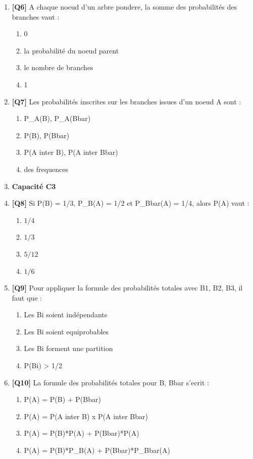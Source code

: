 \begin{enumerate}
\item \textbf{[Q6]} A chaque noeud d'un arbre pondere, la somme des probabilités des branches vaut :
  \begin{enumerate}[label=\Alph*.]
    \item 0
    \item la probabilité du noeud parent
    \item le nombre de branches
    \item 1
  \end{enumerate}

\item \textbf{[Q7]} Les probabilités inscrites sur les branches issues d'un noeud A sont :
  \begin{enumerate}[label=\Alph*.]
    \item P\_A(B), P\_A(Bbar)
    \item P(B), P(Bbar)
    \item P(A inter B), P(A inter Bbar)
    \item des frequences
  \end{enumerate}

\item[] \textbf{Capacité C3}

\item \textbf{[Q8]} Si P(B) = 1/3, P\_B(A) = 1/2 et P\_Bbar(A) = 1/4, alors P(A) vaut :
  \begin{enumerate}[label=\Alph*.]
    \item $1/4$
    \item $1/3$
    \item $5/12$
    \item $1/6$
  \end{enumerate}

\item \textbf{[Q9]} Pour appliquer la formule des probabilités totales avec {B1, B2, B3}, il faut que :
  \begin{enumerate}[label=\Alph*.]
    \item Les Bi soient indépendants
    \item Les Bi soient equiprobables
    \item Les Bi forment une partition
    \item P(Bi) > 1/2
  \end{enumerate}

\item \textbf{[Q10]} La formule des probabilités totales pour {B, Bbar} s'ecrit :
  \begin{enumerate}[label=\Alph*.]
    \item P(A) = P(B) + P(Bbar)
    \item P(A) = P(A inter B) x P(A inter Bbar)
    \item P(A) = P(B)*P(A) + P(Bbar)*P(A)
    \item P(A) = P(B)*P\_B(A) + P(Bbar)*P\_Bbar(A)
  \end{enumerate}


\end{enumerate}
